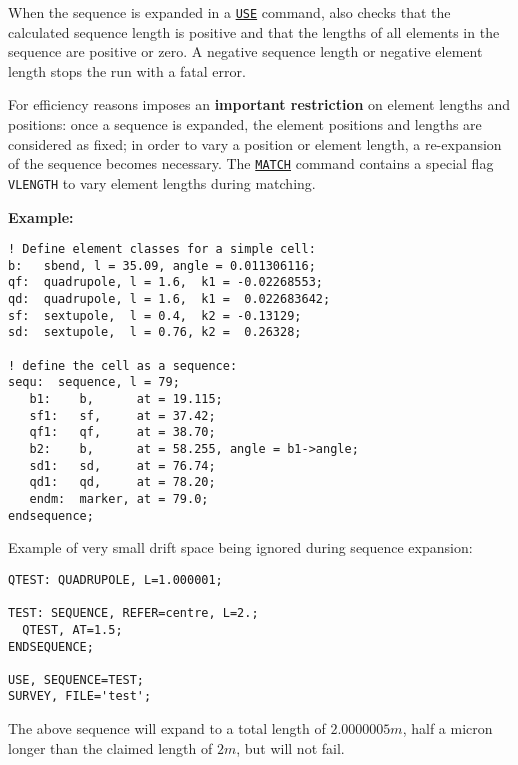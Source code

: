 When the sequence is expanded in a \hyperref[sec:use]{\tt USE} 
command, \madx also checks that the calculated sequence length 
is positive and that the lengths of all elements in the sequence 
are positive or zero. A negative sequence length or negative element 
length stops the \madx run with a fatal error.

For efficiency reasons \madx imposes an {\bf important restriction}
on element lengths and positions: once a sequence is expanded, the
element positions and lengths are considered as fixed; in order to vary
a position or element length, a re-expansion of the sequence becomes
necessary. The \hyperref[chap:match]{\tt MATCH} command contains a special flag 
{\tt VLENGTH} to vary element lengths during matching.

{\bf Example:}
\begin{verbatim}
! Define element classes for a simple cell:
b:   sbend, l = 35.09, angle = 0.011306116;
qf:  quadrupole, l = 1.6,  k1 = -0.02268553;
qd:  quadrupole, l = 1.6,  k1 =  0.022683642;
sf:  sextupole,  l = 0.4,  k2 = -0.13129;
sd:  sextupole,  l = 0.76, k2 =  0.26328;

! define the cell as a sequence:
sequ:  sequence, l = 79;
   b1:    b,      at = 19.115;
   sf1:   sf,     at = 37.42;
   qf1:   qf,     at = 38.70;
   b2:    b,      at = 58.255, angle = b1->angle;
   sd1:   sd,     at = 76.74;
   qd1:   qd,     at = 78.20;
   endm:  marker, at = 79.0;
endsequence;
\end{verbatim}




Example of very small drift space being ignored during sequence
expansion: 
\begin{verbatim}
QTEST: QUADRUPOLE, L=1.000001;

TEST: SEQUENCE, REFER=centre, L=2.;
  QTEST, AT=1.5;
ENDSEQUENCE;

USE, SEQUENCE=TEST;
SURVEY, FILE='test';
\end{verbatim}
The above sequence will expand to a total length of $2.0000005 m$, half
a micron longer than the claimed length of $2 m$, but will not fail.
